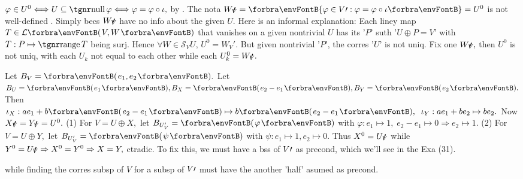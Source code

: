 $\varphi\in U^0\Longleftrightarrow U\subseteq\null\varphi\Longleftrightarrow\varphi=\varphi\circ\iota,$ by .\PfEnd\vspace{3pt}
\ANote The nota $W_V\upapostrophe=\Bra{\varphi\in V\apostrophe:\varphi=\varphi\circ\iota}=U^0$ is not well-defined .\parNot
Simply becs $W_V\!\!\!\prime\,$ have no info about the given $U.$ Here is an informal explanation:\parNot
Each liney map $T\in\Lm{V,W}$ that vanishes on a given nontrivial $U$ has its '$P$'\parNot
{} suth '$U\oplus P=V$' with $T:P\mapsto\range T$ being surj.\parNot
Hence $\forall W\in\mathcal{S}_V U,\,U^0=W_{V}'.$ But given nontrivial '$P$', the corres '$U$' is not uniq.\parNot
Fix one $W_V\!\!\!\prime\,,$ then $U^0$ is not uniq, with each $U_k$ not equal to each other while each $U_k^0=W_V\!\!\!\prime\,.$\par\vspace{2pt}
\AExa Let $B_V=\Par{e_1,e_2}.$ Let $B_U=\Par{e_1},B_X=\Par{e_2-e_1},B_Y=\Par{e_2}.$\parExa
Then $\iota_X:ae_1+b\Par{e_2-e_1}\mapsto b\Par{e_2-e_1},\;\;\iota_Y:ae_1+be_2\mapsto be_2.$ Now $X_V\!\!\!\prime\,=Y_V\!\!\!\prime\,=U^0.$\parExa
(1) For $V=U\oplus X,$ let $B_{U_V'}=\Par{\varphi}$ with $\varphi:e_1\mapsto 1,\;e_2-e_1\mapsto 0\Rightarrow e_2\mapsto 1.$\parExa
(2) For $V=U\oplus Y,$ let $B_{U_V'}=\Par{\psi}$ with $\psi:e_1\mapsto 1,e_2\mapsto 0.$\parExa
Thus $X^0=U_V\!\!\!\prime\,$ while $Y^0=U_V\!\!\!\prime\,\Rightarrow X^0=Y^0\Rightarrow X=Y,$ ctradic.\parExa
To fix this, we must have a bss of $V\prime$ as precond, which we'll see in the {\NOTEFOR} Exa (31).\par\vspace{2pt}
\vspace{-2pt}\parNot
{\tgsl while finding the corres subsp of $V$ for a subsp of $V\prime$ must have the another 'half' asumed as precond.}
\SepLine

